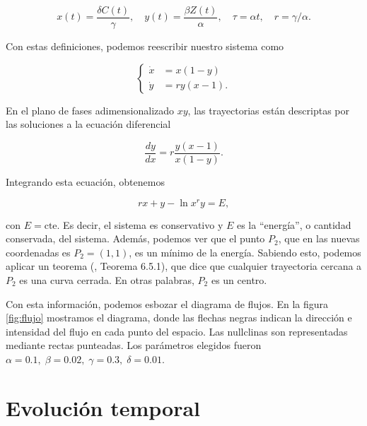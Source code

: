 \documentclass[10pt,twocolumn]{article}
\begin{document}
\begin{equation}
x(t) = \dfrac{\delta C(t)}{\gamma}, \quad y(t) = \dfrac{\beta Z(t)}{\alpha}, \quad \tau = \alpha t, \quad r = \gamma / \alpha.
\end{equation}

Con estas definiciones, podemos reescribir nuestro sistema como 

\begin{equation}
\begin{cases}
\dot{x} &= x (1-y) \\
\dot{y} &= ry (x-1).
\end{cases}
\end{equation}

En el plano de fases adimensionalizado $xy$, las trayectorias están descriptas por las soluciones a la ecuación diferencial

\begin{equation}
\dfrac{dy}{dx} = r\dfrac{y(x-1)}{x(1-y)}.
\end{equation}

Integrando esta ecuación, obtenemos

\begin{equation} \label{eq:energia}
rx + y - \ln x^r y = E,
\end{equation}

con $E = \mathrm{cte}$.
Es decir, el sistema es conservativo y $E$ es la ``energía'', o cantidad conservada, del sistema. Además, podemos ver que el punto $P_2$, que en las nuevas coordenadas es $P_2 = (1,1)$, es un mínimo de la energía. Sabiendo esto, podemos aplicar un teorema (\cite{strogatz}, Teorema 6.5.1), que dice que cualquier trayectoria cercana a $P_2$ es una curva cerrada. En otras palabras, $P_2$ es un centro.



Con esta información, podemos esbozar el diagrama de flujos. En la figura \ref{fig:flujo} mostramos el diagrama, donde las flechas negras indican la dirección e intensidad del flujo en cada punto del espacio. Las nullclinas son representadas mediante rectas punteadas. Los parámetros elegidos fueron $\alpha = 0.1,\; \beta = 0.02,\; \gamma = 0.3,\; \delta = 0.01$.



\section{Evolución temporal}
\end{document}

